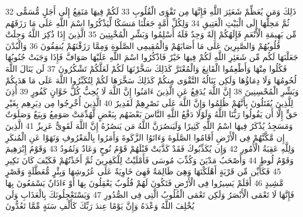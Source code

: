 \documentclass[20pt,a4paper]{article}
\begin{document}
{\tiny\colorbox{cl_aya}{32}} ذَلِكَ وَمَن يُعَظِّمْ شَعَئِرَ اللَّهِ فَإِنَّهَا مِن تَقْوَى الْقُلُوبِ
{\tiny\colorbox{cl_aya}{33}} لَكُمْ فِيهَا مَنَفِعُ إِلَى أَجَلٍ مُّسَمًّى ثُمَّ مَحِلُّهَا إِلَى الْبَيْتِ الْعَتِيقِ
{\tiny\colorbox{cl_aya}{34}} وَلِكُلِّ أُمَّةٍ جَعَلْنَا مَنسَكًا لِّيَذْكُرُوا اسْمَ اللَّهِ عَلَى مَا رَزَقَهُم مِّن بَهِيمَةِ الْأَنْعَمِ فَإِلَهُكُمْ إِلَهٌ وَحِدٌ فَلَهُ أَسْلِمُوا وَبَشِّرِ الْمُخْبِتِينَ
{\tiny\colorbox{cl_aya}{35}} الَّذِينَ إِذَا ذُكِرَ اللَّهُ وَجِلَتْ قُلُوبُهُمْ وَالصَّبِرِينَ عَلَى مَا أَصَابَهُمْ وَالْمُقِيمِى الصَّلَوةِ وَمِمَّا رَزَقْنَهُمْ يُنفِقُونَ
{\tiny\colorbox{cl_aya}{36}} وَالْبُدْنَ جَعَلْنَهَا لَكُم مِّن شَعَئِرِ اللَّهِ لَكُمْ فِيهَا خَيْرٌ فَاذْكُرُوا اسْمَ اللَّهِ عَلَيْهَا صَوَافَّ فَإِذَا وَجَبَتْ جُنُوبُهَا فَكُلُوا مِنْهَا وَأَطْعِمُوا الْقَانِعَ وَالْمُعْتَرَّ كَذَلِكَ سَخَّرْنَهَا لَكُمْ لَعَلَّكُمْ تَشْكُرُونَ
{\tiny\colorbox{cl_aya}{37}} لَن يَنَالَ اللَّهَ لُحُومُهَا وَلَا دِمَاؤُهَا وَلَكِن يَنَالُهُ التَّقْوَى مِنكُمْ كَذَلِكَ سَخَّرَهَا لَكُمْ لِتُكَبِّرُوا اللَّهَ عَلَى مَا هَدَىكُمْ وَبَشِّرِ الْمُحْسِنِينَ
{\tiny\colorbox{cl_aya}{38}} إِنَّ اللَّهَ يُدَفِعُ عَنِ الَّذِينَ ءَامَنُوا إِنَّ اللَّهَ لَا يُحِبُّ كُلَّ خَوَّانٍ كَفُورٍ
{\tiny\colorbox{cl_aya}{39}} أُذِنَ لِلَّذِينَ يُقَتَلُونَ بِأَنَّهُمْ ظُلِمُوا وَإِنَّ اللَّهَ عَلَى نَصْرِهِمْ لَقَدِيرٌ
{\tiny\colorbox{cl_aya}{40}} الَّذِينَ أُخْرِجُوا مِن دِيَرِهِم بِغَيْرِ حَقٍّ إِلَّا أَن يَقُولُوا رَبُّنَا اللَّهُ وَلَوْلَا دَفْعُ اللَّهِ النَّاسَ بَعْضَهُم بِبَعْضٍ لَّهُدِّمَتْ صَوَمِعُ وَبِيَعٌ وَصَلَوَتٌ وَمَسَجِدُ يُذْكَرُ فِيهَا اسْمُ اللَّهِ كَثِيرًا وَلَيَنصُرَنَّ اللَّهُ مَن يَنصُرُهُ إِنَّ اللَّهَ لَقَوِىٌّ عَزِيزٌ
{\tiny\colorbox{cl_aya}{41}} الَّذِينَ إِن مَّكَّنَّهُمْ فِى الْأَرْضِ أَقَامُوا الصَّلَوةَ وَءَاتَوُا الزَّكَوةَ وَأَمَرُوا بِالْمَعْرُوفِ وَنَهَوْا عَنِ الْمُنكَرِ وَلِلَّهِ عَقِبَةُ الْأُمُورِ
{\tiny\colorbox{cl_aya}{42}} وَإِن يُكَذِّبُوكَ فَقَدْ كَذَّبَتْ قَبْلَهُمْ قَوْمُ نُوحٍ وَعَادٌ وَثَمُودُ
{\tiny\colorbox{cl_aya}{43}} وَقَوْمُ إِبْرَهِيمَ وَقَوْمُ لُوطٍ
{\tiny\colorbox{cl_aya}{44}} وَأَصْحَبُ مَدْيَنَ وَكُذِّبَ مُوسَى فَأَمْلَيْتُ لِلْكَفِرِينَ ثُمَّ أَخَذْتُهُمْ فَكَيْفَ كَانَ نَكِيرِ
{\tiny\colorbox{cl_aya}{45}} فَكَأَيِّن مِّن قَرْيَةٍ أَهْلَكْنَهَا وَهِىَ ظَالِمَةٌ فَهِىَ خَاوِيَةٌ عَلَى عُرُوشِهَا وَبِئْرٍ مُّعَطَّلَةٍ وَقَصْرٍ مَّشِيدٍ
{\tiny\colorbox{cl_aya}{46}} أَفَلَمْ يَسِيرُوا فِى الْأَرْضِ فَتَكُونَ لَهُمْ قُلُوبٌ يَعْقِلُونَ بِهَا أَوْ ءَاذَانٌ يَسْمَعُونَ بِهَا فَإِنَّهَا لَا تَعْمَى الْأَبْصَرُ وَلَكِن تَعْمَى الْقُلُوبُ الَّتِى فِى الصُّدُورِ
{\tiny\colorbox{cl_aya}{47}} وَيَسْتَعْجِلُونَكَ بِالْعَذَابِ وَلَن يُخْلِفَ اللَّهُ وَعْدَهُ وَإِنَّ يَوْمًا عِندَ رَبِّكَ كَأَلْفِ سَنَةٍ مِّمَّا تَعُدُّونَ
\end{document}
